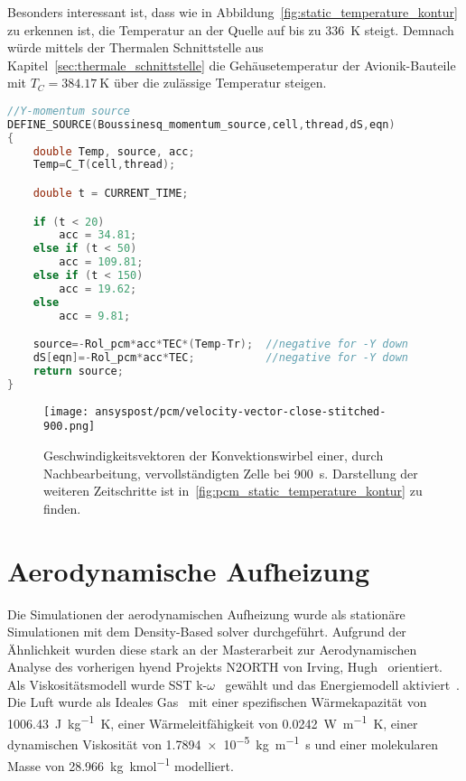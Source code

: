 Besonders interessant ist, dass wie in Abbildung~\ref{fig:static_temperature_kontur} zu erkennen ist, die Temperatur an der Quelle auf bis zu \SI{336}{\kelvin}
steigt. Demnach würde mittels der Thermalen Schnittstelle aus Kapitel~\ref{sec:thermale_schnittstelle} die Gehäusetemperatur der Avionik-Bauteile mit
$T_C = \SI{384,17}{\kelvin}$ über die zulässige Temperatur steigen.

\begin{lstlisting}[language=C, float, caption={Boussinesq-Approximation des Auftriebs im \ac{pcm} in der \ac{udf} eicosane.c}, label={lst:udf_bossinesque}]
//Y-momentum source
DEFINE_SOURCE(Boussinesq_momentum_source,cell,thread,dS,eqn)
{
	double Temp, source, acc;
	Temp=C_T(cell,thread);

	double t = CURRENT_TIME;

	if (t < 20)
		acc = 34.81;
	else if (t < 50)
		acc = 109.81;
	else if (t < 150)
		acc = 19.62;
	else
		acc = 9.81;

	source=-Rol_pcm*acc*TEC*(Temp-Tr);  //negative for -Y down
	dS[eqn]=-Rol_pcm*acc*TEC; 			//negative for -Y down
	return source;
}
\end{lstlisting}

\begin{figure}
  \centering
  \texttt{[image: ansyspost/pcm/velocity-vector-close-stitched-900.png]}
  \caption{Geschwindigkeitsvektoren der Konvektionswirbel einer, durch Nachbearbeitung, vervollständigten Zelle
  bei \SI{900}{\second}. Darstellung der weiteren Zeitschritte ist in~\ref{fig:pcm_static_temperature_kontur} zu finden.}\label{fig:pcm_vectoren_stitched}
\end{figure}

\section{Aerodynamische Aufheizung}\label{sec:sim_aerodynamisch}
Die Simulationen der aerodynamischen Aufheizung wurde als stationäre Simulationen mit dem Density-Based solver durchgeführt.
Aufgrund der Ähnlichkeit wurden diese stark an der Masterarbeit zur Aerodynamischen Analyse des vorherigen
\ac{hyend} Projekts N2ORTH von Irving, Hugh~\cite{Irving-2021} orientiert.
Als Viskositätsmodell wurde SST k-$\omega$~\cite{Irving-2021} gewählt und das Energiemodell aktiviert~\cite{Irving-2021}.
Die Luft wurde als Ideales Gas~\cite{Irving-2021} mit einer spezifischen Wärmekapazität von \SI{1006.43}{\joule\per\kilogram\kelvin},
einer Wärmeleitfähigkeit von \SI{0.0242}{\watt\per\meter\kelvin}, einer dynamischen Viskosität von \SI{1.7894e-5}{\kilogram\per\meter\second}
und einer molekularen Masse von \SI{28,966}{\kilogram\per\kilo\mole} modelliert.

